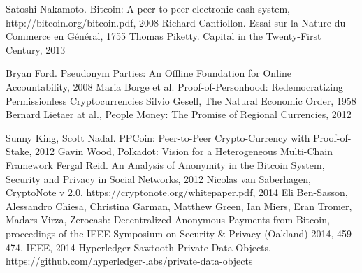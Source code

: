 \documentclass[conference]{IEEEtran}
\begin{document}
\begin{thebibliography}{00}
 Satoshi Nakamoto. Bitcoin: A peer-to-peer electronic cash system, http://bitcoin.org/bitcoin.pdf, 2008
Richard Cantiollon. Essai sur la Nature du Commerce en Général, 1755
Thomas Piketty. Capital in the Twenty-First Century, 2013

 Bryan Ford. Pseudonym Parties:
An Offline Foundation for Online Accountability, 2008
 Maria Borge et al. Proof-of-Personhood: Redemocratizing Permissionless Cryptocurrencies
 Silvio Gesell, The Natural Economic Order, 1958
 Bernard Lietaer at al., People Money: The Promise of Regional Currencies, 2012

 Sunny King, Scott Nadal. PPCoin: Peer-to-Peer Crypto-Currency with Proof-of-Stake, 2012
 Gavin Wood, Polkadot: Vision for a Heterogeneous Multi-Chain Framework
Fergal Reid. An Analysis of Anonymity in the Bitcoin System, Security and Privacy in Social Networks, 2012
 Nicolas van Saberhagen, CryptoNote v 2.0, https://cryptonote.org/whitepaper.pdf, 2014
Eli Ben-Sasson, Alessandro Chiesa, Christina Garman, Matthew Green, Ian Miers, Eran Tromer, Madars Virza, Zerocash: Decentralized Anonymous Payments from Bitcoin, proceedings of the IEEE Symposium on Security \& Privacy (Oakland) 2014, 459-474, IEEE, 2014
Hyperledger Sawtooth Private Data Objects. https://github.com/hyperledger-labs/private-data-objects


\end{thebibliography}
\end{document}
